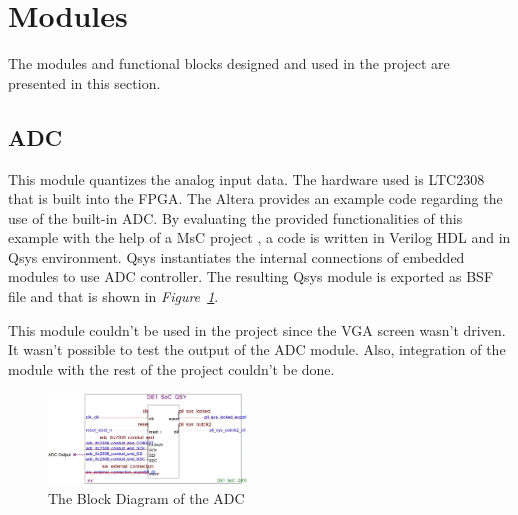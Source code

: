 \documentclass[paper]{IEEEtran}
\begin{document}
\section{Modules}
\- \indent
	The modules and functional blocks designed and used in the project are presented in this section.

\subsection{ADC} \- \indent
		This module quantizes the analog input data. The hardware used is LTC2308 that is built into the FPGA. The Altera provides an example code regarding the use of the built-in ADC\cite{b1}. By evaluating the provided functionalities of this example with the help of a MsC project \cite{b2}, a code is written in Verilog HDL and in Qsys environment. Qsys instantiates the internal connections of embedded modules to use ADC controller. The resulting Qsys module is exported as BSF file and that is shown in \textit{Figure~\ref{fig:adc_block}}.
		
		This module couldn't be used in the project since the VGA screen wasn't driven. It wasn't possible to test the output of the ADC module. Also, integration of the module with the rest of the project couldn't be done.
		
		\begin{figure}[H]
			\setlength{\unitlength}{\textwidth}
			\center 
			\includegraphics[width=0.47\textwidth]{adc_block}
			\caption{\label{fig:adc_block}The Block Diagram of the ADC}
		\end{figure}
\end{document}
